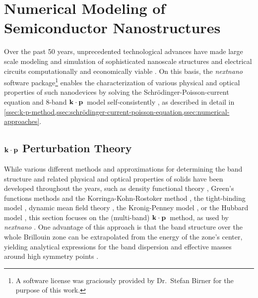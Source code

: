 \section{Numerical Modeling of Semiconductor Nanostructures} \label{sec:nextnano-modeling}
Over the past 50 years, unprecedented technological advances have made large scale modeling and simulation of sophisticated nanoscale structures and electrical circuits computationally and economically viable \cite{More1965,Bank1990,Smith1997,Flamm2003,Wachutka2004,Mack2011,Leiserson2020}. On this basis, the \emph{nextnano} software package\footnote{A software license was graciously provided by Dr.~Stefan Birner for the purpose of this work.} enables the characterization of various physical and optical properties of such nanodevices by solving the Schrödinger-Poisson-current equation and 8-band $\vb{k}\cdot\vb{p}$~model self-consistently \cite{Birner2006,Trellakis2006,Birner2007}, as described in detail in \cref{ssec:k-p-method,ssec:schrödinger-current-poisson-equation,ssec:numerical-approaches}.
\subsection{\boldmath\texorpdfstring{$\vb{k}\cdot\vb{p}$}{k·p} Perturbation Theory} \label{ssec:k-p-method}
While various different methods and approximations for determining the band structure and related physical and optical properties of solids have been developed throughout the years, such as density functional theory \cite{Hellmann1935,Hohenberg1964,Kohn1965,Topp1973,Langreth1983,Becke1988,Perdew1992}, Green's functions methods and the Korringa-Kohn-Rostoker method \cite{Korringa1947,Kohn1954,Dupree1961,Morgan1966,Beeby1967,Madelung1967,Zeller1995,Wildberger1997,Papanikolaou2002,Buth2005,Jiang2011}, the tight-binding model \cite{Slater1954,Kwon1994,Lenosky1997,Schulz2005}, dynamic mean field theory \cite{Georges1992,Georges1996,Kotliar2004,Vollhardt2010}, the Kronig-Penney model \cite{Kronig1931,Singh1983,Cho1987,Yuh1988}, or the Hubbard model \cite{Hubbard1963-I,Hubbard1964-II,Hubbard1964-III}, this section focuses on the (multi-band) $\vb{k}\cdot\vb{p}$~method, as used by \emph{nextnano} \cite{Birner2006,Trellakis2006,Birner2007}. One advantage of this approach is that the band structure over the whole Brillouin zone can be extrapolated from the energy of the zone's center, yielding analytical expressions for the band dispersion and effective masses around high symmetry points \cite{Kittel1987,Piprek2003,Yu2010}.


